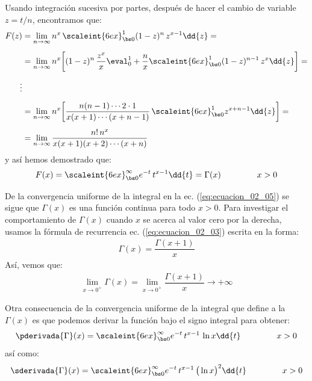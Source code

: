 Usando integración sucesiva por partes, después de hacer el cambio de variable $z = t/n$, encontramos que:
\begin{align}
\begin{aligned}[b]
F(z) &= \lim_{n \to \infty} n^{x} \, \scaleint{6ex}_{\bs 0}^{1} (1 - z)^{n} \, z^{x-1} \dd{z} = \\[0.5em]
&= \lim_{n \to \infty} n^{x} \bigg[ (1 - z)^{n} \, \dfrac{z^{x}}{x} \eval_{0}^{1} + \dfrac{n}{x} \scaleint{6ex}_{\bs 0}^{1} (1 - z)^{n-1} \, z^{x} \dd{z} \bigg] = \\[0.5em]
\vdots& \\[0.5em]
&= \lim_{n \to \infty} n^{x} \bigg[ \dfrac{n (n - 1) \cdots 2 \cdot 1}{x (x + 1) \cdots (x + n - 1)} \, \scaleint{6ex}_{\bs 0}^{1} z^{x+n-1} \dd{z} \bigg] = \\[0.5em]
&= \lim_{n \to \infty} \dfrac{n! \, n^{x}}{x (x + 1)(x + 2) \cdots (x + n)}
\end{aligned}
\label{eq:ecuacion_02_08}
\end{align}
y así hemos demostrado que:
\begin{align}
F(x) = \scaleint{6ex}_{\bs 0}^{\infty} e^{-t} \, t^{x-1} \dd{t} = \Gamma (x) \hspace{1.5cm} x > 0
\label{eq:ecuacion_02_09}
\end{align}

De la convergencia uniforme de la integral en la ec. (\ref{eq:ecuacion_02_05}) se sigue que $\Gamma (x)$ es una función continua para todo $x > 0$. Para investigar el comportamiento de $\Gamma (x)$ cuando $x$ se acerca al valor cero por la derecha, usamos la fórmula de recurrencia ec. (\ref{eq:ecuacion_02_03}) escrita en la forma:
\begin{align*}
\Gamma (x) = \dfrac{\Gamma (x + 1)}{x}
\end{align*}
Así, vemos que:
\begin{align}
\lim_{x \to 0^{+}} \Gamma (x) = \lim_{x \to 0^{+}} \dfrac{\Gamma (x + 1)}{x} \to +\infty
\label{eq:ecuacion_02_10}
\end{align}

Otra consecuencia de la convergencia uniforme de la integral que define a la $\Gamma (x)$ es que podemos derivar la función bajo el signo integral para obtener:
\begin{align}
\pderivada{\Gamma} (x) = \scaleint{6ex}_{\bs 0}^{\infty} e^{-t} \, t^{x-1} \, \ln x \dd{t} \hspace{1.5cm} x > 0
\label{eq:ecuacion_02_11}
\end{align}
así como:
\begin{align}
\sderivada{\Gamma} (x) = \scaleint{6ex}_{\bs 0}^{\infty} e^{-t} \, t^{x-1} \, \big( \ln x \big)^{2} \dd{t} \hspace{1.5cm} x > 0
\label{eq:ecuacion_02_12}
\end{align}

